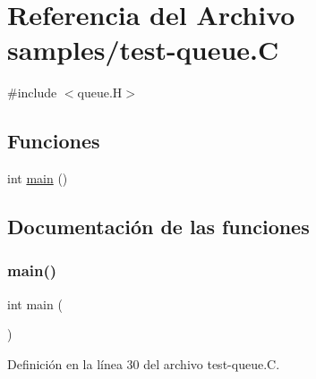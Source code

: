 \hypertarget{test-queue_8_c}{}\section{Referencia del Archivo samples/test-\/queue.C}
\label{test-queue_8_c}
{\ttfamily \#include $<$queue.\+H$>$}\newline
\subsection*{Funciones}
\begin{DoxyCompactItemize}
\item 
int \hyperlink{test-queue_8_c_ae66f6b31b5ad750f1fe042a706a4e3d4}{main} ()
\end{DoxyCompactItemize}


\subsection{Documentación de las funciones}
\mbox{\label{test-queue_8_c_ae66f6b31b5ad750f1fe042a706a4e3d4}} 
\subsubsection{\texorpdfstring{main()}{main()}}
{\footnotesize\ttfamily int main (\begin{DoxyParamCaption}{ }\end{DoxyParamCaption})}



Definición en la línea 30 del archivo test-\/queue.\+C.

